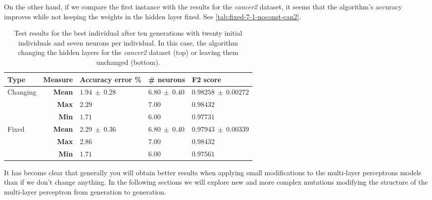 \documentclass[conference]{IEEEtran}\usepackage[]{graphicx}\usepackage[]{color}
\begin{document}
On the other hand, if we compare the first instance with the results for the
\emph{cancer2} dataset, it seems that the algorithm's accuracy improves while
not keeping the weights in the hidden layer fixed. See 
\autoref{tab:fixed-7-1-noconst-can2}.

\begin{table*}
     \centering
     \caption{
Test results for the best individual after ten generations with twenty initial
individuals and seven neurons per individual. In this case, the algorithm
changing the hidden layers for the \emph{cancer2} dataset (top) or leaving them unchanged (bottom).
     }
     \label{tab:fixed-7-1-noconst-can2}
     \begin{tabular}{lr|lll}
     Type   &\textbf{Measure}   & \textbf{Accuracy error \%} & \textbf{\# neurons} & \textbf{F2 score} \\
         \hline
     Changing & \textbf{Mean}      & $1.94\ \pm\ 0.28$ & $6.80\ \pm\ 0.40$  & $0.98258\ \pm\ 0.00272$ \\
         & \textbf{Max}       & $2.29$            & $7.00$             & $0.98432$               \\
         &\textbf{Min}       & $1.71$            & $6.00$             & $0.97731$               \\
         \hline
Fixed &         \textbf{Mean}      & $2.29\ \pm\ 0.36$ & $6.80\ \pm\ 0.40$  & $0.97943\ \pm\ 0.00339$ \\
      &   \textbf{Max}       & $2.86$            & $7.00$             & $0.98432$               \\
      &   \textbf{Min}       & $1.71$            & $6.00$             & $0.97561$               \\
     \end{tabular}
\end{table*}
%
It has become clear that generally you will obtain better results when applying
small modifications to the multi-layer perceptrons models than if we don't
change anything. In the following sections we will explore new and more complex
mutations modifying the structure of the multi-layer perceptron from generation
to generation.
\end{document}
